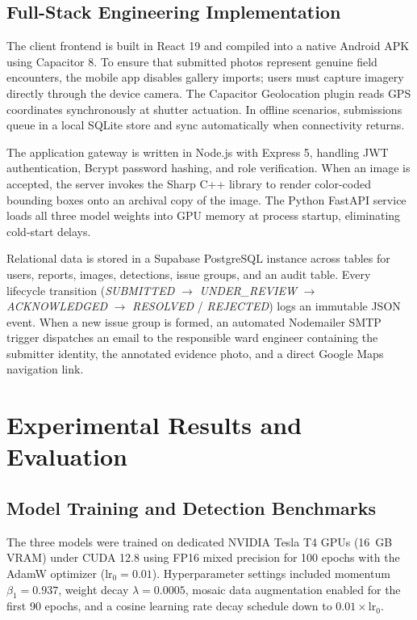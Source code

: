 \subsection{Full-Stack Engineering Implementation}
The client frontend is built in React 19 and compiled into a native Android APK using Capacitor 8. To ensure that submitted photos represent genuine field encounters, the mobile app disables gallery imports; users must capture imagery directly through the device camera. The Capacitor Geolocation plugin reads GPS coordinates synchronously at shutter actuation. In offline scenarios, submissions queue in a local SQLite store and sync automatically when connectivity returns.

The application gateway is written in Node.js with Express 5, handling JWT authentication, Bcrypt password hashing, and role verification. When an image is accepted, the server invokes the Sharp C++ library to render color-coded bounding boxes onto an archival copy of the image. The Python FastAPI service loads all three model weights into GPU memory at process startup, eliminating cold-start delays.

Relational data is stored in a Supabase PostgreSQL instance across tables for users, reports, images, detections, issue groups, and an audit table. Every lifecycle transition (\textit{SUBMITTED} $\to$ \textit{UNDER\_REVIEW} $\to$ \textit{ACKNOWLEDGED} $\to$ \textit{RESOLVED} / \textit{REJECTED}) logs an immutable JSON event. When a new issue group is formed, an automated Nodemailer SMTP trigger dispatches an email to the responsible ward engineer containing the submitter identity, the annotated evidence photo, and a direct Google Maps navigation link.

\section{Experimental Results and Evaluation}

\subsection{Model Training and Detection Benchmarks}
The three models were trained on dedicated NVIDIA Tesla T4 GPUs (16~GB VRAM) under CUDA 12.8 using FP16 mixed precision for 100 epochs with the AdamW optimizer ($\text{lr}_0 = 0.01$). Hyperparameter settings included momentum $\beta_1 = 0.937$, weight decay $\lambda = 0.0005$, mosaic data augmentation enabled for the first 90 epochs, and a cosine learning rate decay schedule down to $0.01 \times \text{lr}_0$.

